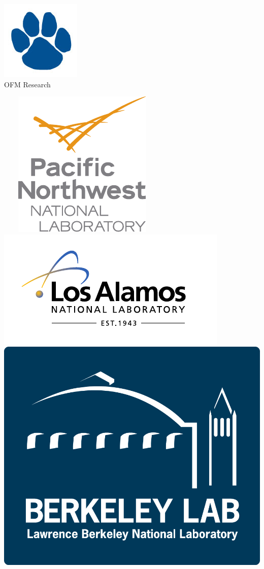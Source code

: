 \begin{center}
\begin{minipage}{1in}
\vspace{-10mm}
\includegraphics[scale=0.30]{./logos/paw.jpg}\\OFM Research
\end{minipage} \ \ \ \
\includegraphics[scale=0.45]{./logos/PNNL_Color_Logo_Vertical} \ \ \ \
\includegraphics[scale=0.5]{./logos/lanl} \ \ \ \
\includegraphics[scale=0.25]{./logos/LBNL_Full_Logo_Final} \ \ \ \

\end{center}
